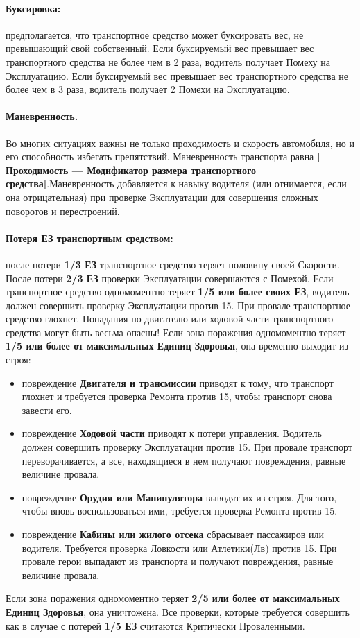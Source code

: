 \paragraph{Буксировка:} предполагается, что транспортное средство может буксировать вес, не превышающий свой собственный. Если буксируемый вес превышает вес транспортного средства не более чем в 2 раза, водитель получает Помеху на Эксплуатацию. Если буксируемый вес превышает вес транспортного средства не более чем в 3 раза, водитель получает 2 Помехи на Эксплуатацию.
\paragraph{Маневренность.} Во многих ситуациях важны не только проходимость и скорость автомобиля, но и его способность избегать препятствий. Маневренность транспорта равна \textbf{|Проходимость — Модификатор размера транспортного средства|}.Маневренность добавляется к навыку
водителя (или отнимается, если она отрицательная) при проверке Эксплуатации для совершения сложных поворотов и перестроений.
\paragraph{Потеря ЕЗ транспортным средством:} после потери \textbf{1/3 ЕЗ}
транспортное средство теряет половину своей Скорости. После
потери \textbf{2/3 ЕЗ} проверки Эксплуатации совершаются с Помехой.
\newline
Если транспортное средство одномоментно теряет \textbf{1/5 или более своих ЕЗ}, водитель должен совершить проверку Эксплуатации против 15. При провале транспортное средство глохнет.
\newline
Попадания по двигателю или ходовой части транспортного средства могут быть весьма опасны! Если зона поражения одномоментно теряет \textbf{1/5 или более от максимальных Единиц Здоровья}, она временно выходит из строя:
\begin{itemize}
\item повреждение \textbf{Двигателя и трансмиссии} приводят к тому, что транспорт глохнет и требуется проверка Ремонта против 15, чтобы транспорт снова завести его.
\item повреждение \textbf{Ходовой части} приводят к потери управления. Водитель должен совершить проверку Эксплуатации против 15. При провале транспорт переворачивается, а все, находящиеся в нем получают повреждения, равные величине провала.
\item повреждение \textbf{Орудия или Манипулятора} выводят их из строя. Для того, чтобы вновь воспользоваться ими, требуется проверка Ремонта против 15.
\item повреждение \textbf{Кабины или жилого отсека} сбрасывает пассажиров или водителя. Требуется проверка Ловкости или Атлетики(Лв) против 15. При провале герои выпадают из транспорта и получают повреждения, равные величине провала.
\end{itemize}
\newline
Если зона поражения одномоментно теряет \textbf{2/5 или более от максимальных Единиц Здоровья}, она уничтожена. Все проверки, которые требуется совершить как в случае с потерей \textbf{1/5 ЕЗ} считаются Критически Проваленными.

